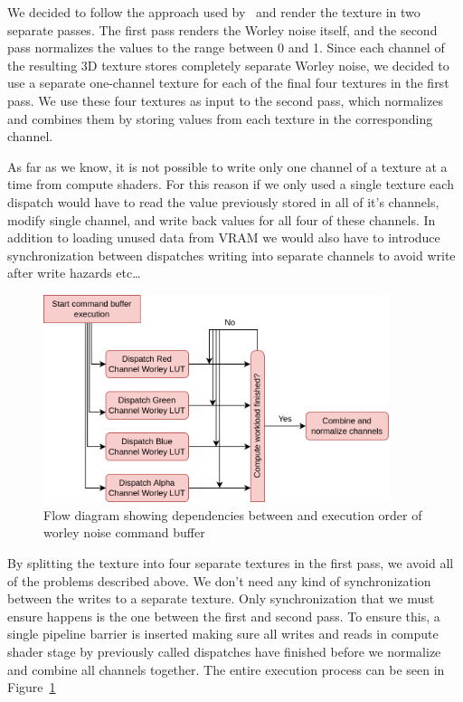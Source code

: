 \documentclass{ctuthesis}
\begin{document}
We decided to follow the approach used by~\cite{lague_2019} and render the texture in two separate passes.
The first pass renders the Worley noise itself, and the second pass normalizes the values to the range between 
0 and 1. Since each channel of the resulting 3D texture stores completely separate Worley noise, we decided
to use a separate one-channel texture for each of the final four textures in the first pass. We use 
these four textures as input to the second pass, which normalizes and combines them by storing values
from each texture in the corresponding channel.

As far as we know, it is not possible to write only one channel of a texture at a time from compute shaders.
For this reason if we only used a single texture each dispatch would have to read the value previously stored
in all of it's channels, modify single channel, and write back values for all four of these channels. In addition
to loading unused data from VRAM we would also have to introduce synchronization between dispatches writing into
separate channels to avoid write after write hazards etc\dots 

\begin{figure}
    \centering
    \includegraphics[width=0.9\textwidth]{media/Worley_command_buffer.png}
    \caption[Worley command buffer dependencies]{Flow diagram showing dependencies between and execution order of worley noise command buffer}
    \label{fig:worley command buffer}
\end{figure}
By splitting the texture into four separate textures in the first pass, we avoid all of the problems described above.
We don't need any kind of synchronization between the writes to a separate texture. Only synchronization that
we must ensure happens is the one between the first and second pass. To ensure this, a single pipeline barrier
is inserted making sure all writes and reads in compute shader stage by previously called dispatches have finished
before we normalize and combine all channels together. The entire execution process can be seen in
Figure~\ref{fig:worley command buffer}
\end{document}
